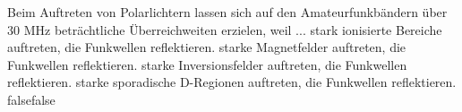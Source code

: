     {Beim Auftreten von Polarlichtern lassen sich auf den Amateurfunkbändern über 30 MHz beträchtliche Überreichweiten erzielen, weil ...}
    {stark ionisierte Bereiche auftreten, die Funkwellen reflektieren.}
    {starke Magnetfelder auftreten, die Funkwellen reflektieren.}
    {starke Inversionsfelder auftreten, die Funkwellen reflektieren.}
    {starke sporadische D-Regionen auftreten, die Funkwellen reflektieren.}
    {false}{false}